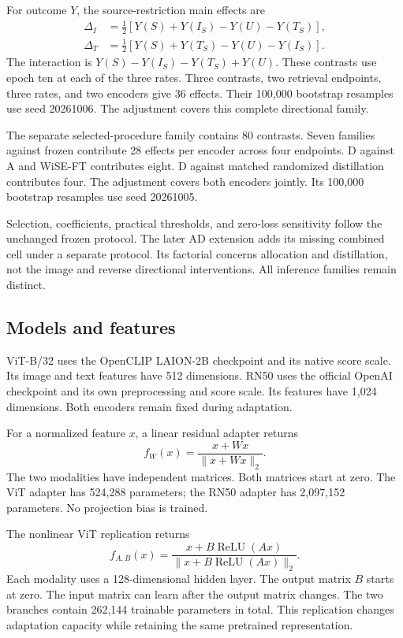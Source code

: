For outcome $Y$, the source-restriction main effects are
\begin{align}
\Delta_I&=\tfrac12[Y(S)+Y(I_S)-Y(U)-Y(T_S)],\\
\Delta_T&=\tfrac12[Y(S)+Y(T_S)-Y(U)-Y(I_S)].
\end{align}
The interaction is $Y(S)-Y(I_S)-Y(T_S)+Y(U)$.
These contrasts use epoch ten at each of the three rates.
Three contrasts, two retrieval endpoints, three rates, and two encoders give 36 effects.
Their 100,000 bootstrap resamples use seed 20261006.
The adjustment covers this complete directional family.

The separate selected-procedure family contains 80 contrasts.
Seven families against frozen contribute 28 effects per encoder across four endpoints.
D against A and WiSE-FT contributes eight.
D against matched randomized distillation contributes four.
The adjustment covers both encoders jointly.
Its 100,000 bootstrap resamples use seed 20261005.

Selection, coefficients, practical thresholds, and zero-loss sensitivity follow the unchanged frozen protocol.
The later AD extension adds its missing combined cell under a separate protocol.
Its factorial concerns allocation and distillation, not the image and reverse directional interventions.
All inference families remain distinct.

\subsection{Models and features}
ViT-B/32 uses the OpenCLIP LAION-2B checkpoint and its native score scale.
Its image and text features have 512 dimensions.
RN50 uses the official OpenAI checkpoint and its own preprocessing and score scale.
Its features have 1,024 dimensions.
Both encoders remain fixed during adaptation.

For a normalized feature $x$, a linear residual adapter returns
\begin{equation}
f_W(x)=\frac{x+Wx}{\|x+Wx\|_2}.
\end{equation}
The two modalities have independent matrices.
Both matrices start at zero.
The ViT adapter has 524,288 parameters; the RN50 adapter has 2,097,152 parameters.
No projection bias is trained.

The nonlinear ViT replication returns
\begin{equation}
f_{A,B}(x)=\frac{x+B\operatorname{ReLU}(Ax)}{\|x+B\operatorname{ReLU}(Ax)\|_2}.
\end{equation}
Each modality uses a 128-dimensional hidden layer.
The output matrix $B$ starts at zero.
The input matrix can learn after the output matrix changes.
The two branches contain 262,144 trainable parameters in total.
This replication changes adaptation capacity while retaining the same pretrained representation.

